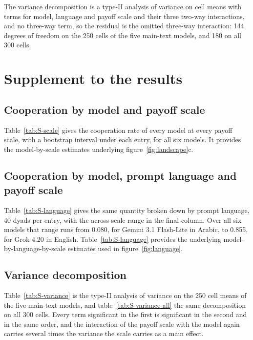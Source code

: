 \documentclass[openacc]{rsproca_new}
\begin{document}
The variance decomposition is a type-II analysis of variance on cell means with
terms for model, language and payoff scale and their three two-way
interactions, and no three-way term, so the residual is the omitted three-way
interaction: 144 degrees of freedom on the 250 cells of the five main-text
models, and 180 on all 300 cells.


\section{Supplement to the results}\label{appendix:results}

\subsection{Cooperation by model and payoff scale}\label{appendix:by_scale}

Table~\ref{tab:S-scale} gives the cooperation rate of every model at every
payoff scale, with a bootstrap interval under each entry, for all six models.
It provides the model-by-scale estimates underlying figure~\ref{fig:landscape}c.

\subsection{Cooperation by model, prompt language and payoff scale}\label{appendix:by_language}

Table~\ref{tab:S-language} gives the same quantity broken down by prompt
language, 40 dyads per entry, with the across-scale range in the final column.
Over all six models that range runs from 0.080, for Gemini 3.1 Flash-Lite in
Arabic, to 0.855, for Grok 4.20 in English. Table~\ref{tab:S-language}
provides the underlying model-by-language-by-scale estimates used in
figure~\ref{fig:language}.

\subsection{Variance decomposition}\label{appendix:variance}

Table~\ref{tab:S-variance} is the type-II analysis of variance on the 250 cell
means of the five main-text models, and table~\ref{tab:S-variance-all} the same
decomposition on all 300 cells. Every term significant in the first is
significant in the second and in the same order, and the interaction of the
payoff scale with the model again carries several times the variance the scale
carries as a main effect.
\end{document}
